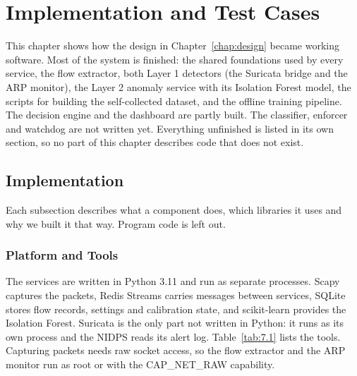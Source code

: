 \chapter{Implementation and Test Cases}\label{chap:7}

\noindent This chapter shows how the design in Chapter~\ref{chap:design} became working software. Most of the system is finished: the shared foundations used by every service, the flow extractor, both Layer 1 detectors (the Suricata bridge and the ARP monitor), the Layer 2 anomaly service with its Isolation Forest model, the scripts for building the self-collected dataset, and the offline training pipeline. The decision engine and the dashboard are partly built. The classifier, enforcer and watchdog are not written yet. Everything unfinished is listed in its own section, so no part of this chapter describes code that does not exist.

\section{Implementation}\label{sec:7.1}

\noindent Each subsection describes what a component does, which libraries it uses and why we built it that way. Program code is left out.

\subsection{Platform and Tools}\label{sec:7.1.1}

\noindent The services are written in Python 3.11 and run as separate processes. Scapy captures the packets, Redis Streams carries messages between services, SQLite stores flow records, settings and calibration state, and scikit-learn provides the Isolation Forest. Suricata is the only part not written in Python: it runs as its own process and the NIDPS reads its alert log. Table~\ref{tab:7.1} lists the tools. Capturing packets needs raw socket access, so the flow extractor and the ARP monitor run as root or with the CAP\_NET\_RAW capability.

